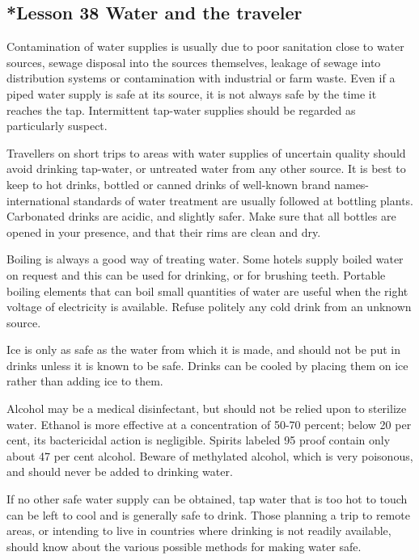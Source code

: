 \documentclass[kindlepaper]{BHCexam4kindle}
\begin{document}
\subsection{*Lesson 38 
Water and the traveler}
\par
Contamination of water supplies is usually due to poor sanitation close to water sources, sewage disposal
into the sources themselves, leakage of sewage into distribution systems or contamination with industrial or
farm waste. Even if a piped water supply is safe at its source, it is not always safe by the time it reaches the tap.
Intermittent tap-water supplies should be regarded as particularly suspect.
\par
Travellers on short trips to areas with water supplies of uncertain quality should avoid drinking tap-water,
or untreated water from any other source. It is best to keep to hot drinks, bottled or canned drinks of
well-known brand names-international standards of water treatment are usually followed at bottling plants.
Carbonated drinks are acidic, and slightly safer. Make sure that all bottles are opened in your presence, and that
their rims are clean and dry.
\par
Boiling is always a good way of treating water. Some hotels supply boiled water on request and this can
be used for drinking, or for brushing teeth. Portable boiling elements that can boil small quantities of water are
useful when the right voltage of electricity is available. Refuse politely any cold drink from an unknown
source.
\par
Ice is only as safe as the water from which it is made, and should not be put in drinks unless it is known to
be safe. Drinks can be cooled by placing them on ice rather than adding ice to them.
\par
Alcohol may be a medical disinfectant, but should not be relied upon to sterilize water. Ethanol is more
effective at a concentration of 50-70 percent; below 20 per cent, its bactericidal action is negligible. Spirits
labeled 95 proof contain only about 47 per cent alcohol. Beware of methylated alcohol, which is very
poisonous, and should never be added to drinking water.
\par
If no other safe water supply can be obtained, tap water that is too hot to touch can be left to cool and is
generally safe to drink. Those planning a trip to remote areas, or intending to live in countries where drinking
is not readily available, should know about the various possible methods for making water safe.
\clearpage
\end{document}
